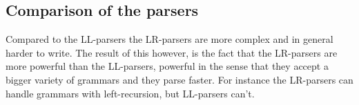 \subsection{Comparison of the parsers}
Compared to the LL-parsers the LR-parsers are more complex and in general harder to write. The result of this however, is the fact that the LR-parsers are more powerful than the LL-parsers, powerful in the sense that they accept a bigger variety of grammars and they parse faster. For instance the LR-parsers can handle grammars with left-recursion, but LL-parsers can't.            